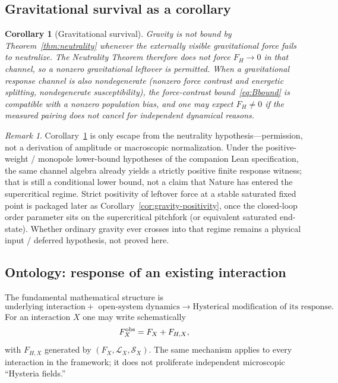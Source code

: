\documentclass[11pt]{article}
\newtheorem{corollary}[theorem]{Corollary}
\theoremstyle{definition}
\theoremstyle{remark}
\newtheorem{remark}[theorem]{Remark}
\begin{document}
\subsection{Gravitational survival as a corollary}
\begin{corollary}[Gravitational survival]\label{cor:gravity-survival}
Gravity is not bound by Theorem~\ref{thm:neutrality} whenever the externally visible gravitational force fails to neutralize.
The Neutrality Theorem therefore does not force $F_H\to0$ in that channel, so a nonzero gravitational leftover is permitted.
When a gravitational response channel is also nondegenerate (nonzero force contrast and energetic splitting, nondegenerate susceptibility), the force-contrast bound~\eqref{eq:Bbound} is compatible with a nonzero population bias, and one may expect $F_H\neq0$ if the measured pairing does not cancel for independent dynamical reasons.
\end{corollary}

\begin{remark}
Corollary~\ref{cor:gravity-survival} is only escape from the neutrality hypothesis---permission, not a derivation of amplitude or macroscopic normalization.
Under the positive-weight / monopole lower-bound hypotheses of the companion Lean specification, the same channel algebra already yields a strictly positive finite response witness; that is still a conditional lower bound, not a claim that Nature has entered the supercritical regime.
Strict positivity of leftover force at a stable saturated fixed point is packaged later as Corollary~\ref{cor:gravity-positivity}, once the closed-loop order parameter sits on the supercritical pitchfork (or equivalent saturated end-state).
Whether ordinary gravity ever crosses into that regime remains a physical input / deferred hypothesis, not proved here.
\end{remark}

\subsection{Ontology: response of an existing interaction}
The fundamental mathematical structure is
\begin{equation}
 \boxed{
 \text{underlying interaction}
 +\text{ open-system dynamics}
 \longrightarrow
 \text{Hysterical modification of its response}.}
\end{equation}
For an interaction $X$ one may write schematically
\begin{equation}
 F_X^{\rm obs}=F_X+F_{H,X},
\end{equation}
with $F_{H,X}$ generated by $(F_X,\mathcal L_X,\mathcal S_X)$.
The same mechanism applies to every interaction in the framework; it does not proliferate independent microscopic ``Hysteria fields.''
\end{document}
